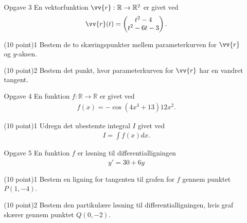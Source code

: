 
\newpage

\begin{opgavetekst}{Opgave 3}
	En vektorfunktion $\vv{r}:\mathbb{R}\to \mathbb{R}^2$ er givet ved
	\begin{align*}
		\vv{r}(t) = 
		\begin{pmatrix}
			t^2-4 \\
			t^2-6t-3
		\end{pmatrix}.
	\end{align*}
\end{opgavetekst}
\begin{delopgave}{(10 point)}{1}
	Bestem de to skæringspunkter mellem parameterkurven for $\vv{r}$ og $y$-aksen.
\end{delopgave}
\begin{delopgave}{(10 point)}{2}
	Bestem det punkt, hvor parameterkurven for $\vv{r}$ har en vandret tangent. 
\end{delopgave}


\begin{opgavetekst}{Opgave 4}
	En funktion $f:\mathbb{R} \to \mathbb{R}$ er givet ved
	\begin{align*}
		f(x) = -\cos(4x^3+13)12x^2.
	\end{align*}
\end{opgavetekst}
\begin{delopgave}{(10 point)}{1}
	Udregn det ubestemte integral $I$ givet ved
	\begin{align*}
		I = \int f(x) dx.
	\end{align*}
\end{delopgave}



\begin{opgavetekst}{Opgave 5}
	En funktion $f$ er løsning til differentialligningen
	\begin{align*}
		y' = 30 + 6y
	\end{align*}
\end{opgavetekst}
\begin{delopgave}{(10 point)}{1}
	Bestem en ligning for tangenten til grafen for $f$ gennem punktet $P(1,-4)$.
\end{delopgave}
\begin{delopgave}{(10 point)}{2}
	Bestem den partikulære løsning til differentialligningen, hvis graf skærer gennem punktet $Q(0,-2)$.
\end{delopgave}

